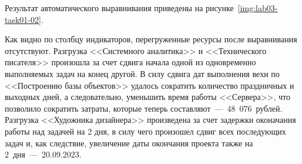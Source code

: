 
Результат автоматического выравнивания приведены на
рисунке~\ref{img:lab03-task01-02}.


Как видно по столбцу индикаторов, перегруженные ресурсы после выравнивания
отсутствуют. Разгрузка <<Системного аналитика>> и <<Технического писателя>>
произошла за счет сдвига начала одной из одновременно выполняемых задач на
конец другой. В силу сдвига дат выполнения вехи по <<Построению базы объектов>>
удалось сократить количество праздничных и выходных дней, а следовательно,
уменьшить время работы <<Сервера>>, что позволило сократить затраты, которые
теперь составляют~---~48~076~рублей. Разгрузка <<Художника дизайнера>>
произведена за счет задержки оконачания работы над задачей на 2 дня, в силу
чего произошел сдвиг всех последующих задач и, как следствие, увеличение даты
окончания проекта также на 2~дня~---~20.09.2023.
